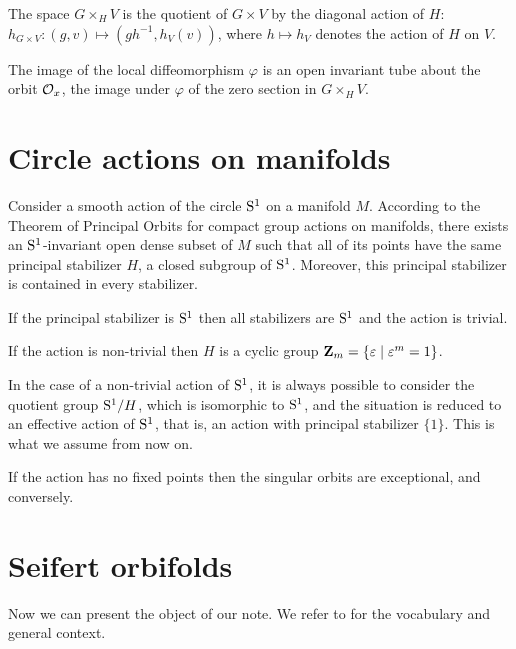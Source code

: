 The space $G \times_H V$ is the quotient of $G \times V$ by the diagonal action of $H$:
$h_{G \times V}: (g,v) \mapsto (gh^{-1}, h_V(v))$,
where $h \mapsto h_V$ denotes the action of $H$ on $V$.

The image of the local diffeomorphism $\varphi$ is an open invariant tube about the orbit $\mathcal{O}_x$,
the image under $\varphi$ of the zero section in $G \times_H V$.


\section{Circle actions on manifolds}

Consider a smooth action of the circle $\mathrm{S}^1$ on a manifold $M$.
According to the Theorem of Principal Orbits for compact group actions on manifolds,
there exists an $\mathrm{S}^1$-invariant open dense subset of $M$ such that all of its points have the same principal stabilizer $H$,
a closed subgroup of $\mathrm{S}^1$.
Moreover, this principal stabilizer is contained in every stabilizer.

If the principal stabilizer is $\mathrm{S}^1$ then all stabilizers are $\mathrm{S}^1$ and the action is trivial.

If the action is non-trivial then $H$ is a cyclic group $\mathbf{Z}_m = \{\varepsilon \mid \varepsilon^m = 1\}$.

In the case of a non-trivial action of $\mathrm{S}^1$,
it is always possible to consider the quotient group $\mathrm{S}^1/H$,
which is isomorphic to $\mathrm{S}^1$,
and the situation is reduced to an effective action of $\mathrm{S}^1$,
that is,
an action with principal stabilizer $\{1\}$.
This is what we assume from now on.

If the action has no fixed points then the singular orbits are exceptional,
and conversely.


\section{Seifert orbifolds}

Now we can present the object of our note.
We refer to \cite{Sco83} for the vocabulary and general context.

